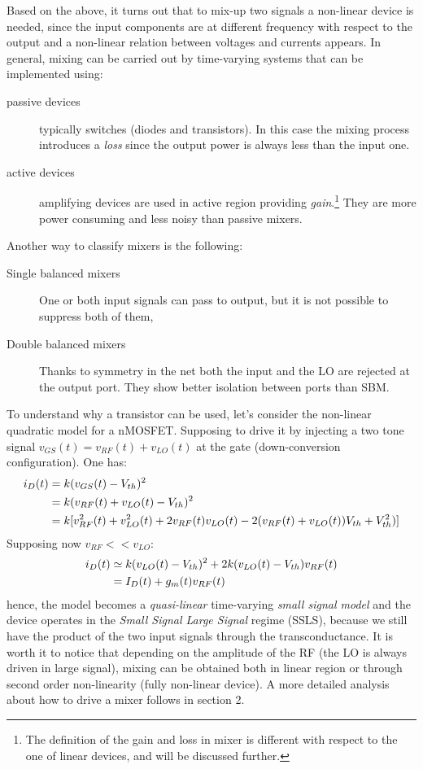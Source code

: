Based on the above, it turns out that to mix-up two signals a non-linear device is needed, since the input components are at different frequency with respect to the output and a non-linear relation between voltages and currents appears. In general, mixing can be carried out by time-varying systems that can be implemented using:
\begin{description}
	\item [passive devices]	typically switches (diodes and transistors). In this case the mixing process introduces a \emph{loss} since the output power is always less than the input one.
	\item [active devices] amplifying devices are used in active region providing \emph{gain}.\footnote{The definition of the gain and loss in mixer is different with respect to the one of linear devices, and will be discussed further.} They are more power consuming and less noisy than passive mixers.
\end{description}
Another way to classify mixers is the following:
\begin{description}
	\item [Single balanced mixers] One or both input signals can pass to output, but it is not possible to suppress both of them,
	\item [Double balanced mixers] Thanks to symmetry in the net both the input and the LO are rejected at the output port. They show better isolation between ports than SBM. 
\end{description}
To understand why a transistor can be used, let's consider the non-linear quadratic model for a nMOSFET. Supposing to drive it by injecting a two tone signal $v_{GS}(t)=v_{RF}(t)+v_{LO}(t)$ at the gate (down-conversion configuration). One has:
\begin{align}
i_D(t) &= k(v_{GS}(t)-V_{th})^2 \notag \\
& = k(v_{RF}(t)+v_{LO}(t)-V_{th})^2 \notag \\
& = k[v_{RF}^2(t)+v_{LO}^2(t)+2v_{RF}(t)v_{LO}(t)-2(v_{RF}(t)+v_{LO}(t))V_{th}+V_{th}^2)] \notag
\end{align}
Supposing now $v_{RF}<<v_{LO}$:
\begin{align}
i_D(t) &\simeq k(v_{LO}(t)-V_{th})^2+2k(v_{LO}(t)-V_{th})v_{RF}(t) \notag  \\
& = I_D(t)+g_m(t)v_{RF}(t) \notag
\end{align}
hence, the model becomes a \emph{quasi-linear} time-varying \emph{small signal model} and the device operates in the \emph{Small Signal Large Signal} regime (SSLS), because we still have the product of the two input signals through the transconductance. It is worth it to notice that depending on the amplitude of the RF (the LO is always driven in large signal), mixing can be obtained both in linear region or through second order non-linearity (fully non-linear device).
A more detailed analysis about how to drive a mixer follows in section 2.

